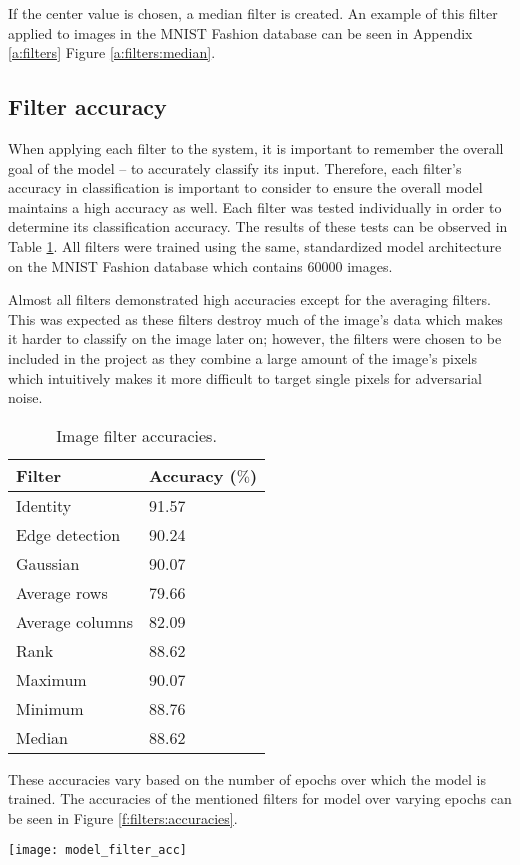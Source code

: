 			If the center value is chosen, a median filter is created. An example of this filter applied to images in the MNIST Fashion database \cite{zalandoresearchFashionMNIST} can be seen in Appendix \ref{a:filters} Figure \ref{a:filters:median}.

	\subsection{Filter accuracy} \label{s:filters:accuracy}
		When applying each filter to the system, it is important to remember the overall goal of the model -- to accurately classify its input. Therefore, each filter's accuracy in classification is important to consider to ensure the overall model maintains a high accuracy as well. Each filter was tested individually in order to determine its classification accuracy. The results of these tests can be observed in Table \ref{t:filterAccuracies}. All filters were trained using the same, standardized model architecture on the MNIST Fashion database \cite{zalandoresearchFashionMNIST} which contains \(60000\) images.

		Almost all filters demonstrated high accuracies except for the averaging filters. This was expected as these filters destroy much of the image's data which makes it harder to classify on the image later on; however, the filters were chosen to be included in the project as they combine a large amount of the image's pixels which intuitively makes it more difficult to target single pixels for adversarial noise.
		\begin{table}
			\begin{center}
				\caption{Image filter accuracies.}
				\label{t:filterAccuracies}
				\begin{tabular}{l|l}\hline
					\textbf{Filter} & \textbf{Accuracy (\(\%\))}\\\hline
					Identity & 91.57\\\hline
					Edge detection & 90.24\\\hline
					Gaussian & 90.07\\\hline
					Average rows & 79.66\\\hline
					Average columns & 82.09\\\hline
					Rank & 88.62\\\hline
					Maximum & 90.07\\\hline
					Minimum & 88.76\\\hline
					Median & 88.62\\\hline
				\end{tabular}
			\end{center}
		\end{table}

		These accuracies vary based on the number of epochs over which the model is trained. The accuracies of the mentioned filters for model over varying epochs can be seen in Figure \ref{f:filters:accuracies}.
		\begin{figure*}
			\texttt{[image: model\_filter\_acc]}
			\caption{Classification accuracy during training for various image filters.}
			\label{f:filters:accuracies}
		\end{figure*}
